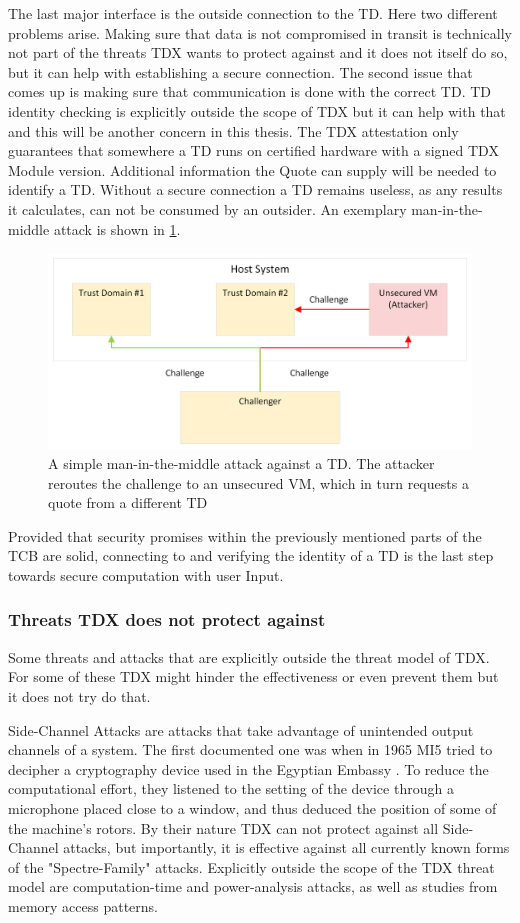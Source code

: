 The last major interface is the outside connection to the TD. Here two different problems arise. Making sure that data is not compromised in transit is technically not part of the threats TDX wants to protect against and it does not itself do so,  but it can help with establishing a secure connection. The second issue that comes up is making sure that communication is done with the correct TD. TD identity checking is explicitly outside the scope of TDX but it can help with that and this will be another concern in this thesis. The TDX attestation only guarantees that somewhere a TD runs on certified hardware with a signed TDX Module version. Additional information the Quote can supply will be needed to identify a TD. Without a secure connection a TD remains useless, as any results it calculates, can not be consumed by an outsider. An exemplary man-in-the-middle attack is shown in \ref{fig:man_in_the_middle}.
\begin{figure}
   \centering
       \includegraphics[width=.75\textwidth]{figures/Man-In-The-Middle.png} 
 \caption{A simple man-in-the-middle attack against a TD. The attacker reroutes the challenge to an unsecured VM, which in turn requests a quote from a different TD}
 \label{fig:man_in_the_middle}
\end{figure}
Provided that security promises within the previously mentioned parts of the TCB are solid, connecting to and verifying the identity of a \Gls{TD} is the last step towards secure computation with user Input.

\subsubsection{Threats TDX does not protect against}

Some threats and attacks that are explicitly outside the threat model of TDX. For some of these TDX might hinder the effectiveness or even prevent them but it does not try do that.


Side-Channel Attacks are attacks that take advantage of unintended output channels of a system. The first documented one was when in 1965 MI5 tried to decipher a cryptography device used in the Egyptian Embassy \cite{zhou_side-channel_nodate}. To reduce the computational effort, they listened to the setting of the device through a microphone placed close to a window, and thus deduced the position of some of the machine's rotors.
By their nature TDX can not protect against all Side-Channel attacks, but importantly, it is effective against all currently known forms of the "Spectre-Family" attacks. Explicitly outside the scope of the TDX threat model are computation-time and power-analysis attacks, as well as studies from memory access patterns.

